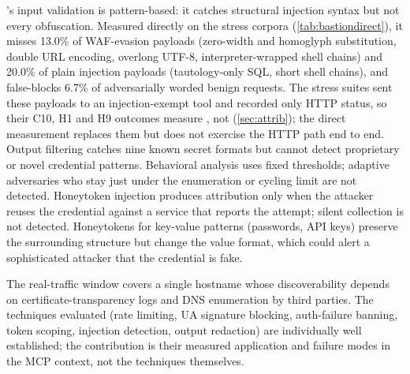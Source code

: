 \documentclass[10pt,twocolumn]{article}
\begin{document}
\bastion{}'s input validation is pattern-based: it catches structural injection
syntax but not every obfuscation. Measured directly on the stress corpora
(\cref{tab:bastiondirect}), it misses 13.0\% of WAF-evasion payloads
(zero-width and homoglyph substitution, double URL encoding, overlong UTF-8,
interpreter-wrapped shell chains) and 20.0\% of plain injection payloads
(tautology-only SQL, short shell chains), and false-blocks 6.7\% of
adversarially worded benign requests. The stress suites sent these payloads
to an injection-exempt tool and recorded only HTTP status, so their C10, H1
and H9 outcomes measure \sys{}, not \bastion{} (\cref{sec:attrib}); the
direct measurement replaces them but does not exercise the HTTP path end to
end. Output filtering catches nine
known secret formats but cannot detect proprietary or novel credential
patterns. Behavioral analysis uses fixed thresholds; adaptive adversaries
who stay just under the enumeration or cycling limit are not detected.
Honeytoken injection produces attribution only when the attacker reuses the
credential against a service that reports the attempt; silent collection is
not detected. Honeytokens for key-value patterns (passwords, API keys)
preserve the surrounding structure but change the value format, which could
alert a sophisticated attacker that the credential is fake.

The real-traffic window covers a single hostname whose discoverability depends
on certificate-transparency logs and DNS enumeration by third parties. The
techniques evaluated (rate limiting, UA signature blocking, auth-failure banning,
token scoping, injection detection, output redaction)
are individually well established; the contribution
is their measured application and failure modes in the MCP context, not the
techniques themselves.
\end{document}
